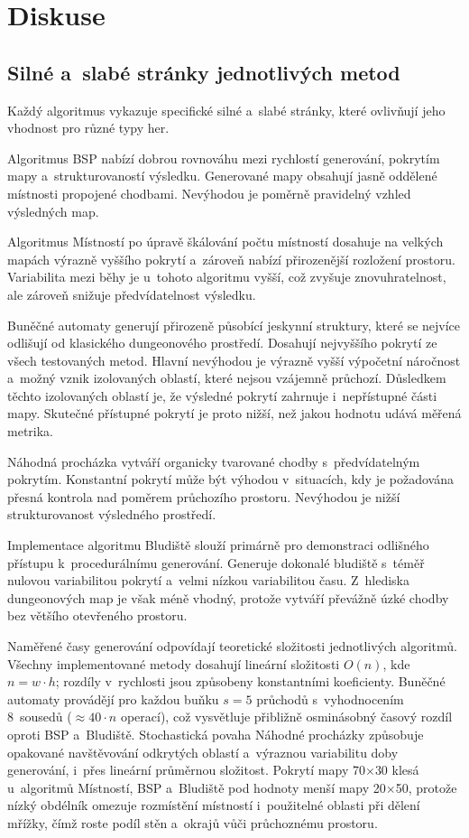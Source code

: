 \documentclass[
   program=itk,
   biblatex,
   figures=true,
   tables=true,
   glossaries,
   index
]{kidiplom}
\begin{document}
\section{Diskuse}

\subsection{Silné a~slabé stránky jednotlivých metod}

Každý algoritmus vykazuje specifické silné a~slabé stránky, které ovlivňují jeho vhodnost pro různé typy her.

Algoritmus BSP nabízí dobrou rovnováhu mezi rychlostí generování, pokrytím mapy a~strukturovaností výsledku. Generované mapy obsahují jasně oddělené místnosti propojené chodbami. Nevýhodou je poměrně pravidelný vzhled výsledných map.

Algoritmus Místností po úpravě škálování počtu místností dosahuje na velkých mapách výrazně vyššího pokrytí a~zároveň nabízí přirozenější rozložení prostoru. Variabilita mezi běhy je u~tohoto algoritmu vyšší, což zvyšuje znovuhratelnost, ale zároveň snižuje předvídatelnost výsledku.

Buněčné automaty generují přirozeně působící jeskynní struktury, které se nejvíce odlišují od klasického dungeonového prostředí. Dosahují nejvyššího pokrytí ze všech testovaných metod. Hlavní nevýhodou je výrazně vyšší výpočetní náročnost a~možný vznik izolovaných oblastí, které nejsou vzájemně průchozí. Důsledkem těchto izolovaných oblastí je, že výsledné pokrytí zahrnuje i~nepřístupné části mapy. Skutečné přístupné pokrytí je proto nižší, než jakou hodnotu udává měřená metrika.

Náhodná procházka vytváří organicky tvarované chodby s~předvídatelným pokrytím. Konstantní pokrytí může být výhodou v~situacích, kdy je požadována přesná kontrola nad poměrem průchozího prostoru. Nevýhodou je nižší strukturovanost výsledného prostředí.

Implementace algoritmu Bludiště slouží primárně pro demonstraci odlišného přístupu k~procedurálnímu generování. Generuje dokonalé bludiště s~téměř nulovou variabilitou pokrytí a~velmi nízkou variabilitou času. Z~hlediska dungeonových map je však méně vhodný, protože vytváří převážně úzké chodby bez většího otevřeného prostoru.

Naměřené časy generování odpovídají teoretické složitosti jednotlivých algoritmů. Všechny implementované metody dosahují lineární složitosti $O(n)$, kde $n = w \cdot h$; rozdíly v~rychlosti jsou způsobeny konstantními koeficienty. Buněčné automaty provádějí pro každou buňku $s = 5$ průchodů s~vyhodnocením 8~sousedů ($\approx 40 \cdot n$ operací), což vysvětluje přibližně osminásobný časový rozdíl oproti BSP a~Bludiště. Stochastická povaha Náhodné procházky způsobuje opakované navštěvování odkrytých oblastí a~výraznou variabilitu doby generování, i~přes lineární průměrnou složitost. Pokrytí mapy 70$\times$30 klesá u~algoritmů Místností, BSP a~Bludiště pod hodnoty menší mapy 20$\times$50, protože nízký obdélník omezuje rozmístění místností i~použitelné oblasti při dělení mřížky, čímž roste podíl stěn a~okrajů vůči průchoznému prostoru.
\end{document}
